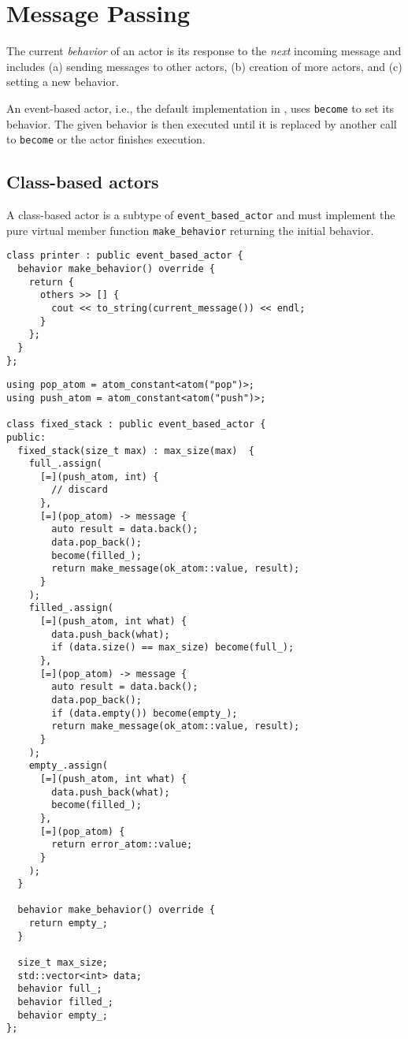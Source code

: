 \section{Message Passing}

The current \textit{behavior} of an actor is its response to the \textit{next} incoming message and includes (a) sending messages to other actors, (b) creation of more actors, and (c) setting a new behavior.

An event-based actor, i.e., the default implementation in \lib, uses \lstinline^become^ to set its behavior.
The given behavior is then executed until it is replaced by another call to \lstinline^become^ or the actor finishes execution.

\subsection{Class-based actors}

A class-based actor is a subtype of \lstinline^event_based_actor^ and must implement the pure virtual member function \lstinline^make_behavior^ returning the initial behavior.

\begin{lstlisting}
class printer : public event_based_actor {
  behavior make_behavior() override {
    return {
      others >> [] {
        cout << to_string(current_message()) << endl;
      }
    };
  }
};
\end{lstlisting}

\clearpage
\begin{lstlisting}
using pop_atom = atom_constant<atom("pop")>;
using push_atom = atom_constant<atom("push")>;

class fixed_stack : public event_based_actor {
public:
  fixed_stack(size_t max) : max_size(max)  {
    full_.assign(
      [=](push_atom, int) {
        // discard
      },
      [=](pop_atom) -> message {
        auto result = data.back();
        data.pop_back();
        become(filled_);
        return make_message(ok_atom::value, result);
      }
    );
    filled_.assign(
      [=](push_atom, int what) {
        data.push_back(what);
        if (data.size() == max_size) become(full_);
      },
      [=](pop_atom) -> message {
        auto result = data.back();
        data.pop_back();
        if (data.empty()) become(empty_);
        return make_message(ok_atom::value, result);
      }
    );
    empty_.assign(
      [=](push_atom, int what) {
        data.push_back(what);
        become(filled_);
      },
      [=](pop_atom) {
        return error_atom::value;
      }
    );
  }

  behavior make_behavior() override {
    return empty_;
  }

  size_t max_size;
  std::vector<int> data;
  behavior full_;
  behavior filled_;
  behavior empty_;
};
\end{lstlisting}

